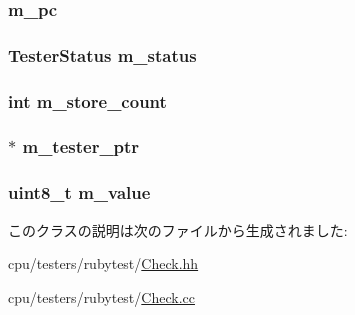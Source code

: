 \label{classCheck_aedeaccd67403213e1e43d99ff1c70f44}
\hypertarget{classCheck_a054fda5975595c15c2cb078c5bc10888}{
\subsubsection[{m\_\-pc}]{ {\bf m\_\-pc}}}
\label{classCheck_a054fda5975595c15c2cb078c5bc10888}
\hypertarget{classCheck_a70259b2e0a9ded04ee46b786d423b50c}{
\subsubsection[{m\_\-status}]{\setlength{\rightskip}{0pt plus 5cm}TesterStatus {\bf m\_\-status}}}
\label{classCheck_a70259b2e0a9ded04ee46b786d423b50c}
\hypertarget{classCheck_ad10763fc3ed0f7ccb24a268ad25ccc7d}{
\subsubsection[{m\_\-store\_\-count}]{\setlength{\rightskip}{0pt plus 5cm}int {\bf m\_\-store\_\-count}}}
\label{classCheck_ad10763fc3ed0f7ccb24a268ad25ccc7d}
\hypertarget{classCheck_aaff3af064462a4d4b7f986a4a2454ff0}{
\subsubsection[{m\_\-tester\_\-ptr}]{$\ast$ {\bf m\_\-tester\_\-ptr}}}
\label{classCheck_aaff3af064462a4d4b7f986a4a2454ff0}
\hypertarget{classCheck_a5307fc878e97122f4a7fc315f2329c08}{
\subsubsection[{m\_\-value}]{\setlength{\rightskip}{0pt plus 5cm}uint8\_\-t {\bf m\_\-value}}}
\label{classCheck_a5307fc878e97122f4a7fc315f2329c08}


このクラスの説明は次のファイルから生成されました:\begin{DoxyCompactItemize}
\item 
cpu/testers/rubytest/\hyperlink{Check_8hh}{Check.hh}\item 
cpu/testers/rubytest/\hyperlink{Check_8cc}{Check.cc}\end{DoxyCompactItemize}
